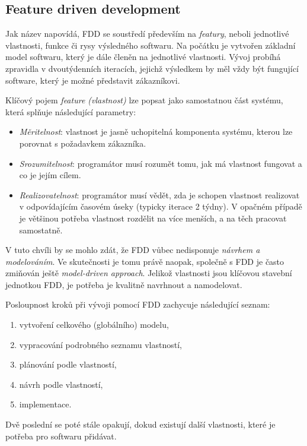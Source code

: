 \subsection{Feature driven development} \label{methods:fdd}

Jak název napovídá, FDD se soustředí především na \emph{featury}, neboli jednotlivé vlastnosti, funkce či rysy výsledného softwaru. Na počátku je vytvořen základní model softwaru, který je dále členěn na jednotlivé vlastnosti. Vývoj probíhá zpravidla v dvoutýdenních iteracích, jejichž výsledkem by měl vždy být fungující software, který je možné představit zákazníkovi.

Klíčový pojem \emph{feature (vlastnost)}  lze popsat jako samostatnou část systému, která splňuje následující parametry:
\begin{itemize}
	\item \emph{Měritelnost}: vlastnost je jasně uchopitelná komponenta systému, kterou lze porovnat s požadavkem zákazníka.
	\item \emph{Srozumitelnost}: programátor musí rozumět tomu, jak má vlastnost fungovat a co je jejím cílem.
	\item \emph{Realizovatelnost}: programátor musí vědět, zda je schopen vlastnost realizovat v odpovídajícím časovém úseky (typicky iterace 2 týdny). V opačném případě je většinou potřeba vlastnost rozdělit na více menších, a na těch pracovat samostatně.
\end{itemize}

V tuto chvíli by se mohlo zdát, že FDD vůbec nedisponuje \emph{návrhem a modelováním}. Ve skutečnosti je tomu právě naopak, společně s FDD je často zmiňován ještě \emph{model-driven approach}. Jelikož vlastnosti jsou klíčovou stavební jednotkou FDD, je potřeba je kvalitně navrhnout a namodelovat.

Posloupnost kroků při vývoji pomocí FDD zachycuje následující seznam:
\begin{enumerate}
	\item vytvoření celkového (globálního) modelu,
	\item vypracování podrobného seznamu vlastností,
	\item plánování podle vlastností,
	\item návrh podle vlastností,
	\item implementace.
\end{enumerate}
Dvě poslední se poté stále opakují, dokud existují další vlastnosti, které je potřeba pro softwaru přidávat.

